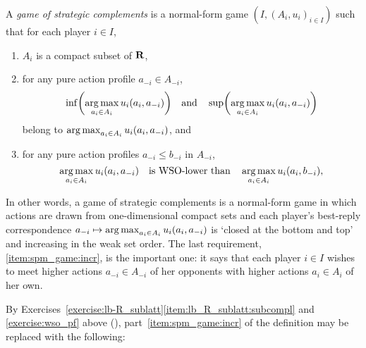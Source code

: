 \begin{definition}
	\label{definition:spm_game}
	A \emph{game of strategic complements} is a normal-form game $(I,(A_i,u_i)_{i \in I})$ such that for each player $i \in I$,
	
	\begin{enumerate}[label=(\alph*)]
	
		\item \label{item:spm_game:real} $A_i$ is a compact subset of $\mathbf{R}$,

		\item \label{item:spm_game:compact} for any pure action profile $a_{-i} \in A_{-i}$,
		\begin{equation*}
			\inf \left( \argmax_{a_i \in A_i} u_i(a_i,a_{-i}) \right)
			\quad \text{and} \quad
			\sup \left( \argmax_{a_i \in A_i} u_i(a_i,a_{-i}) \right)
		\end{equation*}
		belong to $\operatorname*{arg\,max}_{a_i \in A_i} u_i(a_i,a_{-i})$, and

		\item \label{item:spm_game:incr} for any pure action profiles $a_{-i} \leq b_{-i}$ in $A_{-i}$,
		\begin{equation*}
			\operatorname*{arg\,max}_{a_i \in A_i} u_i(a_i,a_{-i})
			\quad \text{is WSO-lower than} \quad
			\operatorname*{arg\,max}_{a_i \in A_i} u_i(a_i,b_{-i}) ,
		\end{equation*}
	
	\end{enumerate}
\end{definition}

In other words, a game of strategic complements is a normal-form game in which actions are drawn from one-dimensional compact sets and each player's best-reply correspondence $a_{-i} \mapsto \operatorname*{arg\,max}_{a_i \in A_i} u_i(a_i,a_{-i})$ is `closed at the bottom and top' and increasing in the weak set order. The last requirement, \ref{item:spm_game:incr}, is the important one: it says that each player $i \in I$ wishes to meet higher actions $a_{-i} \in A_{-i}$ of her opponents with higher actions $a_i \in A_i$ of her own.

By Exercises~\ref{exercise:lb-R_sublatt}\ref{item:lb_R_sublatt:subcompl} and \ref{exercise:wso_pf} above (), part~\ref{item:spm_game:incr} of the definition may be replaced with the following:

